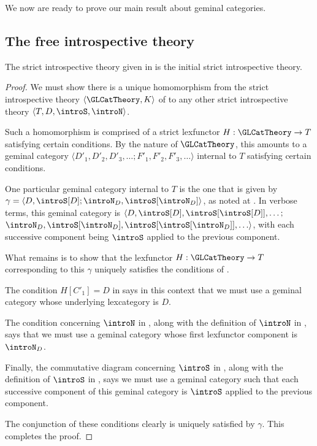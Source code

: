 We now are ready to prove our main result about geminal categories.

\subsection{The free introspective theory}
\begin{theorem}\label{InitialIntrospectiveTheory}
The strict introspective theory given in  is the initial strict introspective theory.
\end{theorem}
\begin{proof}
We must show there is a unique homomorphism from the strict introspective theory $\langle \GLCatTheory, K \rangle$ of  to any other strict introspective theory $\langle T, D, \introS, \introN \rangle$.

Such a homomorphism is comprised of a strict lexfunctor $H : \GLCatTheory \to T$ satisfying certain conditions. By the nature of $\GLCatTheory$, this amounts to a geminal category $\langle D'_1, D'_2, D'_3, \ldots; F'_1, F'_2, F'_3, \ldots \rangle$ internal to $T$ satisfying certain conditions.

One particular geminal category internal to $T$ is the one that is given by $\gamma = \langle D, \introS[D]; \introN_D, \introS[\introN_D] \rangle$, as noted at . In verbose terms, this geminal category is $\langle D, \introS[D], \introS[\introS[D]], \ldots;$ $ \introN_D, \introS[\introN_D], \introS[\introS[\introN_D]], \ldots \rangle$, with each successive component being $\introS$ applied to the previous component.

What remains is to show that the lexfunctor $H : \GLCatTheory \to T$ corresponding to this $\gamma$ uniquely satisfies the conditions of .

The condition $H[C'_1] = D$ in  says in this context that we must use a geminal category whose underlying lexcategory is $D$.

The condition concerning $\introN$ in , along with the definition of $\introN$ in , says that we must use a geminal category whose first lexfunctor component is $\introN_{D}$.

Finally, the commutative diagram concerning $\introS$ in , along with the definition of $\introS$ in , says we must use a geminal category such that each successive component of this geminal category is $\introS$ applied to the previous component.

The conjunction of these conditions clearly is uniquely satisfied by $\gamma$. This completes the proof.
\end{proof}

